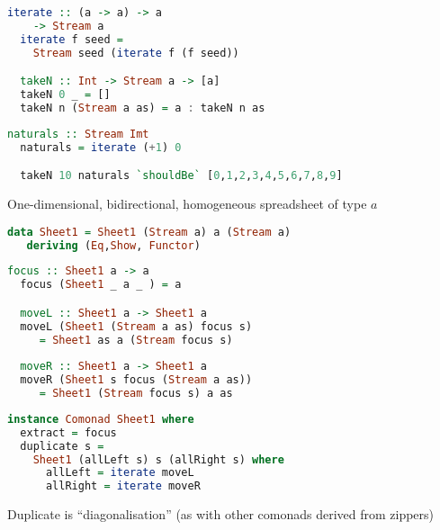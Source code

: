 \documentclass[10pt]{beamer}
\begin{document}
\begin{frame}[fragile]
\begin{lstlisting}[language=haskell, basicstyle=\ttfamily]
  iterate :: (a -> a) -> a 
    -> Stream a
  iterate f seed = 
    Stream seed (iterate f (f seed))  

  takeN :: Int -> Stream a -> [a] 
  takeN 0 _ = [] 
  takeN n (Stream a as) = a : takeN n as 
\end{lstlisting}
\end{frame}

\begin{frame}[fragile]
\begin{lstlisting}[language=haskell, basicstyle=\ttfamily]
  naturals :: Stream Imt
  naturals = iterate (+1) 0 

  takeN 10 naturals `shouldBe` [0,1,2,3,4,5,6,7,8,9]
\end{lstlisting}
\end{frame}


\begin{frame}[fragile]
  One-dimensional, bidirectional, homogeneous spreadsheet of type $a$
\begin{lstlisting}[language=haskell, basicstyle=\ttfamily]
data Sheet1 = Sheet1 (Stream a) a (Stream a)
   deriving (Eq,Show, Functor)
\end{lstlisting}
\end{frame}

\begin{frame}[fragile]
  \begin{lstlisting}[language=haskell, basicstyle=\ttfamily]
  focus :: Sheet1 a -> a
  focus (Sheet1 _ a _ ) = a

  moveL :: Sheet1 a -> Sheet1 a
  moveL (Sheet1 (Stream a as) focus s) 
     = Sheet1 as a (Stream focus s)
  
  moveR :: Sheet1 a -> Sheet1 a
  moveR (Sheet1 s focus (Stream a as)) 
     = Sheet1 (Stream focus s) a as
  \end{lstlisting}
\end{frame}

\begin{frame}[fragile]
\begin{lstlisting}[language=haskell, basicstyle=\ttfamily]
instance Comonad Sheet1 where
  extract = focus
  duplicate s = 
    Sheet1 (allLeft s) s (allRight s) where 
      allLeft = iterate moveL
      allRight = iterate moveR
\end{lstlisting}
  Duplicate is ``diagonalisation'' (as with other comonads derived from zippers) 
\end{frame}
\end{document}
